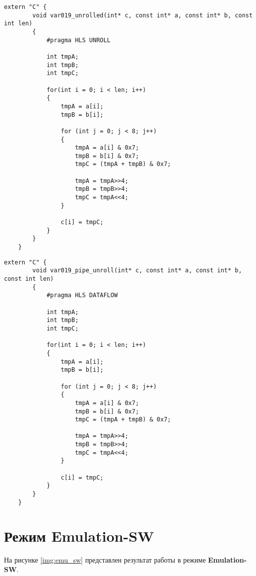 \begin{center}
    \captionsetup{justification=raggedright,singlelinecheck=off}
    \begin{lstlisting}[label=lst:var19_unrolled,caption=Код программы (частично развернутый цикл)]
	extern "C" {
		void var019_unrolled(int* c, const int* a, const int* b, const int len) 
		{
			#pragma HLS UNROLL
	
			int tmpA;
			int tmpB;
			int tmpC;
	
			for(int i = 0; i < len; i++)
			{
				tmpA = a[i];
				tmpB = b[i];
	
				for (int j = 0; j < 8; j++)
				{
					tmpA = a[i] & 0x7;
					tmpB = b[i] & 0x7;
					tmpC = (tmpA + tmpB) & 0x7;
					
					tmpA = tmpA>>4;
					tmpB = tmpB>>4;
					tmpC = tmpA<<4;
				}
	
				c[i] = tmpC;
			}
		}
	}
\end{lstlisting}
\end{center}


\begin{center}
    \captionsetup{justification=raggedright,singlelinecheck=off}
    \begin{lstlisting}[label=lst:var19_unroll,caption=Код программы (конвейрный с частично развернутым циклом)]
	extern "C" {
		void var019_pipe_unroll(int* c, const int* a, const int* b, const int len) 
		{
			#pragma HLS DATAFLOW
	
			int tmpA;
			int tmpB;
			int tmpC;
	
			for(int i = 0; i < len; i++)
			{
				tmpA = a[i];
				tmpB = b[i];
	
				for (int j = 0; j < 8; j++)
				{
					tmpA = a[i] & 0x7;
					tmpB = b[i] & 0x7;
					tmpC = (tmpA + tmpB) & 0x7;
					
					tmpA = tmpA>>4;
					tmpB = tmpB>>4;
					tmpC = tmpA<<4;
				}
	
				c[i] = tmpC;
			}
		}
	}
\end{lstlisting}
\end{center}

\clearpage


\section{Режим Emulation-SW}

На рисунке \ref{img:emu_sw} представлен результат работы в режиме \textbf{Emulation-SW}.




